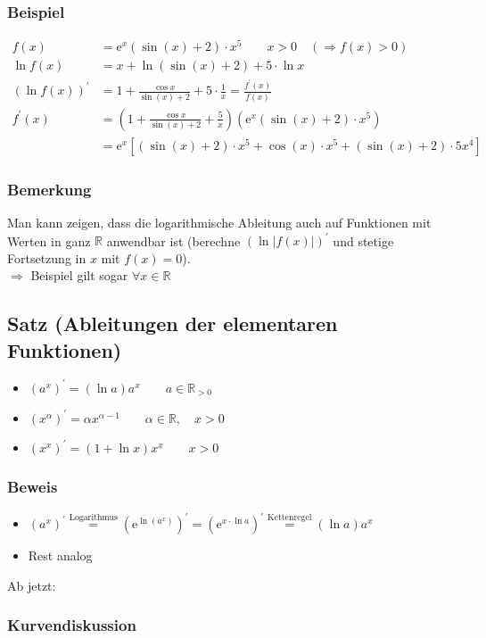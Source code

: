 \documentclass[12pt, titlepage]{article}
\newcommand{\R}{\mathds{R}}
\newcommand{\e}{\textrm{e}}
\renewcommand{\>}{\rightarrow}
\renewcommand{\*}{\cdot}
\begin{document}
	\subsubsection*{Beispiel}
	\begin{align*}
		f(x)&=\e^x(\sin(x)+2)\*x^5\qquad x>0\quad(\Rightarrow f(x)>0)\\
		\ln f(x)&=x+\ln(\sin(x)+2)+5\*\ln x\\
		(\ln f(x))^\prime&=1+\frac{\cos x}{\sin(x)+2}+5\*\frac{1}{x}=\frac{f^\prime(x)}{f(x)}\\
		f^\prime(x)&=(1+\frac{\cos x}{\sin(x)+2}+\frac{5}{x})(\e^x(\sin(x)+2)\*x^5)\\
		&=\e^x[(\sin(x)+2)\*x^5+\cos(x)\*x^5+(\sin(x)+2)\*5x^4]
	\end{align*}
	\subsubsection*{Bemerkung}
	Man kann zeigen, dass die logarithmische Ableitung auch auf Funktionen mit Werten in ganz $\R$ anwendbar ist (berechne $(\ln|f(x)|)^\prime$ und stetige Fortsetzung in $x$ mit $f(x)=0$).\\
	$\Rightarrow$ Beispiel gilt sogar $\forall x\in \R$
	\subsection{Satz (Ableitungen der elementaren Funktionen)}
	\begin{itemize}
		\item $(a^x)^\prime=(\ln a)a^x\qquad a\in\R_{>0}$
		\item $(x^\alpha)^\prime=\alpha x^{\alpha-1}\qquad\alpha\in\R,\quad x>0$
		\item $(x^x)^\prime=(1+\ln x)x^x\qquad x>0$
	\end{itemize}
	\subsubsection*{Beweis}
	\begin{itemize}
		\item $(a^x)^\prime\overset{\textrm{Logarithmus}}{=}(\e^{\ln(a^x)})^\prime=(\e^{x\*\ln a})^\prime\overset{\textrm{Kettenregel}}{=}(\ln a)a^x$
		\item Rest analog
	\end{itemize}
	Ab jetzt:
	\subsubsection*{Kurvendiskussion}
\end{document}
